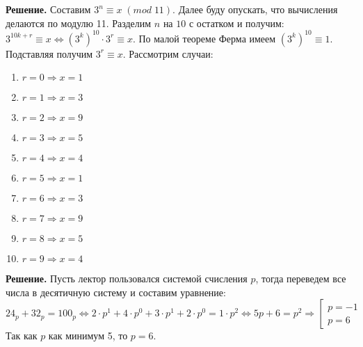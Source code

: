 \documentclass[a4paper, 12pt]{article}
\begin{document}
\begin{spacing}{1}
\begin{center}
\end{center}
\textbf{Решение.} Составим $3^n\equiv x\;(mod\;11)$. Далее буду опускать, что вычисления делаются по модулю 11. Разделим $n$ на $10$ с остатком и получим: $3^{10k + r} \equiv x \Leftrightarrow (3^k)^{10} \cdot 3^r \equiv x$. По малой теореме Ферма имеем $(3^k)^{10} \equiv 1$. Подставляя получим $3^r \equiv x$. Рассмотрим случаи:
\begin{enumerate}
	\item $r = 0 \Rightarrow x = 1$
	\item $r = 1 \Rightarrow x = 3$
	\item $r = 2 \Rightarrow x = 9$
	\item $r = 3 \Rightarrow x = 5$
	\item $r = 4 \Rightarrow x = 4$
	\item $r = 5 \Rightarrow x = 1$
	\item $r = 6 \Rightarrow x = 3$
	\item $r = 7 \Rightarrow x = 9$
	\item $r = 8 \Rightarrow x = 5$
	\item $r = 9 \Rightarrow x = 4$
\end{enumerate} 


\begin{center}
\end{center}
\textbf{Решение.} Пусть лектор пользовался системой счисления $p$, тогда переведем все числа в десятичную систему и составим уравнение:
$$
24_p + 32_p = 100_p \Leftrightarrow 2\cdot p^1 + 4 \cdot p^0 + 3 \cdot p^1 + 2 \cdot p^0 = 1 \cdot p^2 \Leftrightarrow 5p + 6 = p^2 \Rightarrow \left[\begin{array}{l}
	p = -1\\
	p = 6
\end{array}\right.
$$
Так как $p$ как минимум 5, то $p = 6$.
\end{spacing}
\end{document}
